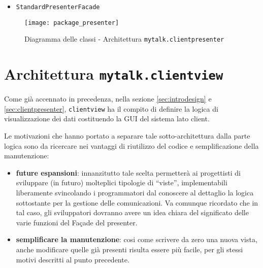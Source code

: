 \begin{itemize}[leftmargin=0em]
\item \texttt{StandardPresenterFacade}

\end{itemize}

\begin{figure}[H]
\begin{center}
\texttt{[image: package\_presenter]}
\caption{Diagramma delle classi - Architettura \texttt{mytalk.clientpresenter}}\label{fig:package_presenter}
\end{center}
\end{figure}
\clearpage

\section{Architettura \texttt{mytalk.clientview}}\label{sec:clientview}
Come già accennato in precedenza, nella sezione \ref{sec:introdesign} e \ref{sec:clientpresenter}, \texttt{clientview} ha il compito di definire la logica di visualizzazione dei dati costituendo la GUI del sistema lato client.

Le motivazioni che hanno portato a separare tale sotto-architettura dalla parte logica sono da ricercare nei vantaggi di riutilizzo del codice e semplificazione della manutenzione:
\begin{itemize}
 	\item \textbf{future espansioni}: innanzitutto tale scelta permetterà ai progettisti di sviluppare (in futuro) molteplici tipologie di ``viste'', implementabili liberamente svincolando i programmatori dal conoscere al dettaglio la logica sottostante per la gestione delle comunicazioni. Va comunque ricordato che in tal caso, gli sviluppatori dovranno avere un idea chiara del significato delle varie funzioni del Façade del presenter.
 	\item \textbf{semplificare la manutenzione}: cosi come scrivere da zero una nuova vista, anche modificare quelle già presenti risulta essere più facile, per gli stessi motivi descritti al punto precedente.
\end{itemize}

